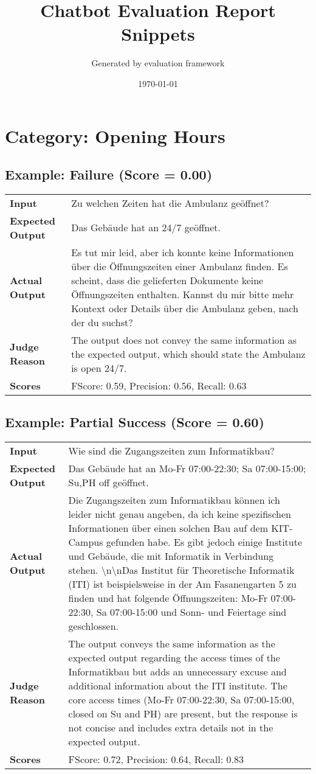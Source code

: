 \documentclass{article}
\title{Chatbot Evaluation Report Snippets}
\author{Generated by evaluation framework}
\date{\today}
\begin{document}
\maketitle
\section*{Category: Opening Hours}
\subsection*{Example: Failure (Score = 0.00)}
\begin{longtable}{p{} p{}}
\textbf{Input} & Zu welchen Zeiten hat die Ambulanz geöffnet? \\
\textbf{Expected Output} & Das Gebäude hat an 24/7 geöffnet. \\
\textbf{Actual Output} & Es tut mir leid, aber ich konnte keine Informationen über die Öffnungszeiten einer Ambulanz finden. Es scheint, dass die gelieferten Dokumente keine Öffnungszeiten enthalten. Kannst du mir bitte mehr Kontext oder Details über die Ambulanz geben, nach der du suchst? \\
\textbf{Judge Reason} & The output does not convey the same information as the expected output, which should state the Ambulanz is open 24/7. \\
\textbf{Scores} & FScore: 0.59, Precision: 0.56, Recall: 0.63 \\
\end{longtable}
\subsection*{Example: Partial Success (Score = 0.60)}
\begin{longtable}{p{} p{}}
\textbf{Input} & Wie sind die Zugangszeiten zum Informatikbau? \\
\textbf{Expected Output} & Das Gebäude hat an Mo-Fr 07:00-22:30; Sa 07:00-15:00; Su,PH off geöffnet. \\
\textbf{Actual Output} & Die Zugangszeiten zum Informatikbau können ich leider nicht genau angeben, da ich keine spezifischen Informationen über einen solchen Bau auf dem KIT-Campus gefunden habe. Es gibt jedoch einige Institute und Gebäude, die mit Informatik in Verbindung stehen. \textbackslash{}n\textbackslash{}nDas Institut für Theoretische Informatik (ITI) ist beispielsweise in der Am Fasanengarten 5 zu finden und hat folgende Öffnungszeiten: Mo-Fr 07:00-22:30, Sa 07:00-15:00 und Sonn- und Feiertage sind geschlossen. \\
\textbf{Judge Reason} & The output conveys the same information as the expected output regarding the access times of the Informatikbau but adds an unnecessary excuse and additional information about the ITI institute. The core access times (Mo-Fr 07:00-22:30, Sa 07:00-15:00, closed on Su and PH) are present, but the response is not concise and includes extra details not in the expected output. \\
\textbf{Scores} & FScore: 0.72, Precision: 0.64, Recall: 0.83 \\
\end{longtable}
\end{document}
